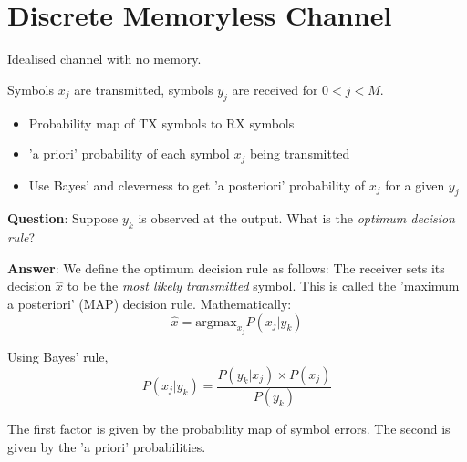 \documentclass[12pt]{article}
\begin{document}
\section{Discrete Memoryless Channel}
Idealised channel with no memory.

Symbols $x_j$ are transmitted, symbols $y_j$ are received for $0<j<M$.

\begin{itemize}[noitemsep]
    \item Probability map of TX symbols to RX symbols
    \item 'a priori' probability of each symbol $x_j$ being transmitted
    \item Use Bayes' and cleverness to get 'a posteriori' probability of $x_j$ for a given $y_j$
\end{itemize}
\textbf{Question}: Suppose $y_k$ is observed at the output. What is the \textit{optimum decision rule}?

\textbf{Answer}: We define the optimum decision rule as follows: The receiver sets its decision $\hat{x}$ to be the \textit{most likely transmitted} symbol. This is called the 'maximum a posteriori' (MAP) decision rule. Mathematically:
\[\hat{x}=\text{argmax}_{x_j} P(x_j|y_k) \]

Using Bayes' rule,
\[P(x_j|y_k) = \frac{P(y_k|x_j) \times P(x_j) }{P(y_k)}\]

The first factor is given by the probability map of symbol errors. The second is given by the 'a priori' probabilities.
\end{document}
